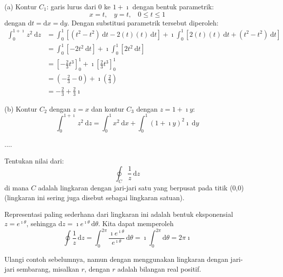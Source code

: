 (a) Kontur $C_{1}$: garis lurus dari $0$ ke $1+\imath$ dengan bentuk
parametrik:
\[
x=t,\ \ \ \ y=t,\ \ \ \ 0\leq t\leq1
\]
dengan $\mathrm{d}t=\mathrm{d}x=\mathrm{d}y$. Dengan substitusi parametrik
tersebut diperoleh:
\begin{align*}
\int_{0}^{1+\imath}z^{2}\ \mathrm{d}z & =\int_{0}^{1}\left[\left(t^{2}-t^{2}\right)\ \mathrm{d}t-2(t)(t)\ \mathrm{d}t\right]+\imath\int_{0}^{1}\left[2(t)(t)\ \mathrm{d}t+\left(t^{2}-t^{2}\right)\ \mathrm{d}t\right]\\
 & =\int_{0}^{1}\left[-2t^{2}\ \mathrm{d}t\right]+\imath\int_{0}^{1}\left[2t^{2}\ \mathrm{d}t\right]\\
 & =\left[-\frac{2}{3}t^{3}\right]_{0}^{1} + \imath\left[\frac{2}{3}t^{3}\right]_{0}^{1}\\
 & =\left(-\frac{2}{3}-0\right) + \imath\left(\frac{2}{3}\right)\\
 & =-\frac{2}{3}+\frac{2}{3}\imath
\end{align*}

(b) Kontur $C_{2}$ dengan $z=x$ dan kontur $C_{3}$ dengan $z=1+\imath y$:
\begin{equation*}
\int_{0}^{1+\imath}z^{2}\ \mathrm{d}z = \int_{0}^{1}x^{2}\ \mathrm{d}x +
\int_{0}^{1}\left(1 + \imath y\right)^{2} \imath\ \mathrm{d}y
\end{equation*}

....


\begin{contoh}
Tentukan nilai dari:
\begin{equation*}
\oint_{C} \frac{1}{z} \, \mathrm{d}z    
\end{equation*}
di mana $C$ adalah lingkaran dengan jari-jari satu yang berpusat
pada titik (0,0) (lingkaran ini sering juga disebut sebagai lingkaran satuan).
\end{contoh}

Representasi paling sederhana dari lingkaran ini adalah bentuk
eksponensial $z = e^{\imath \theta}$, sehingga
$\mathrm{d}z = \imath e^{\imath \theta}\, \mathrm{d}\theta$.
Kita dapat memperoleh
\begin{equation*}
\oint \frac{1}{z} \, \mathrm{d}z = \int_{0}^{2\pi}
\frac{\imath e^{\imath \theta}}{e^{\imath \theta}} \, \mathrm{d}\theta =
\imath \int_{0}^{2\pi} \mathrm{d}\theta = 2\pi \imath 
\end{equation*}

\begin{soal}
Ulangi contoh sebelumnya, namun dengan menggunakan lingkaran dengan jari-jari sembarang,
misalkan $r$, dengan $r$ adalah bilangan real positif.
\end{soal}



